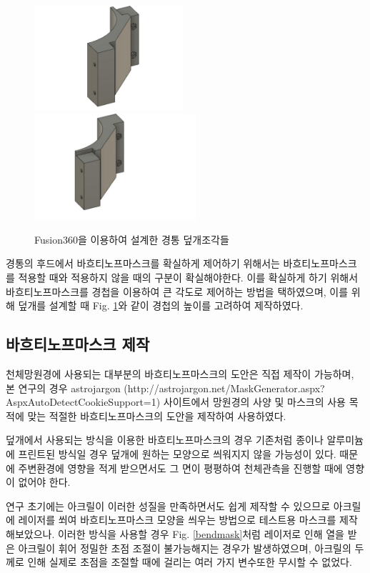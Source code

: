 \documentclass[twoside,11pt]{gshs_thesis}
\begin{document}
\bigskip
\bigskip
\begin{figure}[h]
	\begin{center}
			\includegraphics[width = 5.5cm]{coverpeice1}
			\includegraphics[width = 6cm]{coverpeice2}
	\end{center}
	\caption{Fusion360을 이용하여 설계한 경통 덮개조각들}
	\label{coverpeice}
\end{figure}

경통의 후드에서 바흐티노프마스크를 확실하게 제어하기 위해서는 바흐티노프마스크를 적용할 때와 적용하지 않을 때의 구분이 확실해야한다. 이를 확실하게 하기 위해서 바흐티노프마스크를 경첩을 이용하여 큰 각도로 제어하는 방법을 택하였으며, 이를 위해 덮개를 설계할 때 Fig. \ref{coverpeice}와 같이 경첩의 높이를 고려하여 제작하였다.

\subsection{바흐티노프마스크 제작}
천체망원경에 사용되는 대부분의 바흐티노프마스크의 도안은 직접 제작이 가능하며, 본 연구의 경우 astrojargon (http://astrojargon.net/MaskGenerator.aspx?AspxAutoDetectCookieSupport=1) 사이트에서 망원경의 사양 및 마스크의 사용 목적에 맞는 적절한 바흐티노프마스크의 도안을 제작하여 사용하였다.

덮개에서 사용되는 방식을 이용한 바흐티노프마스크의 경우 기존처럼 종이나 알루미늄에 프린트된 방식일 경우 덮개에 원하는 모양으로 씌워지지 않을 가능성이 있다. 때문에 주변환경에 영향을 적게 받으면서도 그 면이 평평하여 천체관측을 진행할 때에 영향이 없어야 한다. 


연구 초기에는 아크릴이 이러한 성질을 만족하면서도 쉽게 제작할 수 있으므로 아크릴에 레이저를 쐬여 바흐티노프마스크 모양을 씌우는 방법으로 테스트용 마스크를 제작해보았으나. 이러한 방식을 사용할 경우 Fig. \ref{bendmask}처럼 레이저로 인해 열을 받은 아크릴이 휘어 정밀한 초점 조절이 불가능해지는 경우가 발생하였으며, 아크릴의 두께로 인해 실제로 초점을 조절할 때에 걸리는 여러 가지 변수또한 무시할 수 없었다.
\end{document}
